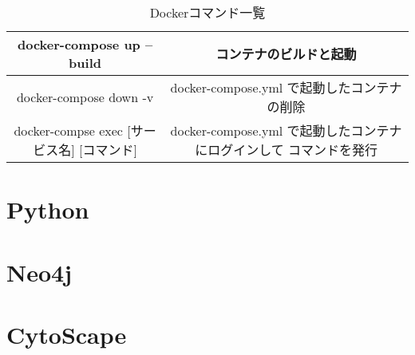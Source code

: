 \begin{table}[htb]
\centering
\caption{Dockerコマンド一覧}
\label{tab:docker_cmd}
\begin{tabular}{|c|c|}  \hline
    docker-compose up --build & コンテナのビルドと起動 \\ \hline
    docker-compose down -v & docker-compose.yml で起動したコンテナの削除 \\ \hline
    docker-compse exec [サービス名] [コマンド] & docker-compose.yml で起動したコンテナにログインして
    コマンドを発行 \\ \hline		  
\end{tabular}
\end{table}

\section{Python}\label{sec:python}

\section{Neo4j}\label{sec:neo4j}

\section{CytoScape}\label{sec:cyto}